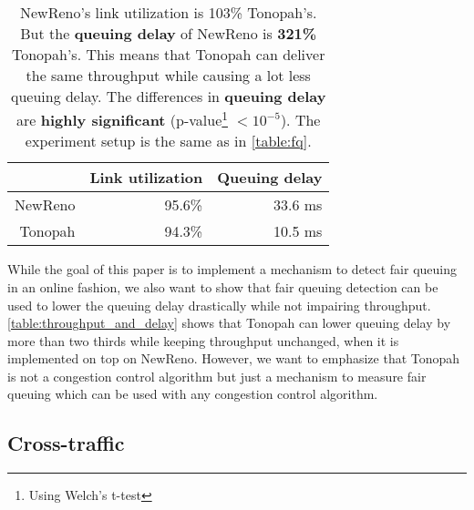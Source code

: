 \documentclass[conference]{IEEEtran}
\begin{document}
\begin{table}
\begin{minipage}{\columnwidth}
\centering
\begin{tabular}{| r | r | r |}
\hline
& Link utilization & Queuing delay \\ \hline
NewReno & 95.6\% & 33.6 ms \\ \hline
Tonopah & 94.3\% & 10.5 ms \\ \hline
\end{tabular}
\caption{NewReno's link utilization is 103\% Tonopah's. 
But the \textbf{queuing delay} of NewReno is \textbf{321\%} Tonopah's. 
This means that Tonopah can deliver the same throughput while causing a lot less queuing delay. 
The differences in \textbf{queuing delay} are \textbf{highly significant} (p-value\protect\footnote{Using Welch's t-test} $< 10^{-5}$). 
The experiment setup is the same as in \autoref{table:fq}. }
\label{table:throughput_and_delay}
\end{minipage}
\end{table}    

While the goal of this paper is to implement a mechanism to detect fair queuing in an online fashion, 
we also want to show that fair queuing detection can be used to lower the queuing delay drastically while not impairing throughput. 
\autoref{table:throughput_and_delay} shows that Tonopah can lower queuing delay by more than two thirds while keeping throughput unchanged, when it is implemented on top on NewReno. 
However, we want to emphasize that Tonopah is not a congestion control algorithm but just a mechanism to measure fair queuing which can be used with any congestion control algorithm. 

\subsection{Cross-traffic}
\end{document}
